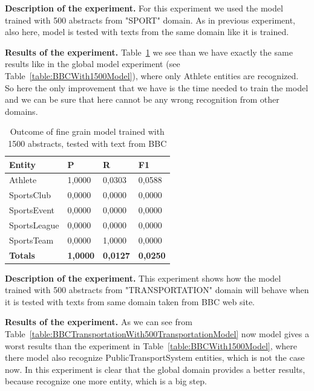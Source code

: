 \documentclass[thesis=M,english]{FITthesis}[2018/05/30]
\begin{document}
\textbf{Description of the experiment.} For this experiment we used the model trained with 500 abstracts from "SPORT" domain. As in previous experiment, also here, model is tested with texts from the same domain like it is trained.

\textbf{Results of the experiment.} Table~\ref{table:BBCSportWith500SportModel} we see than we have exactly the same results like in the global model experiment (see Table~\ref{table:BBCWith1500Model}), where only Athlete entities are recognized. So here the only improvement that we have is the time needed to train the model and we can be sure that here cannot be any wrong recognition from other domains.
	
	\begin{table}[H]\centering
	\begin{tabular}{|l|l|l|l|}
		\hline {\textbf{Entity}} & {\textbf{P}} & {\textbf{R}} & {\textbf{F1}}\\\hline
        Athlete & 1,0000 & 0,0303 & 0,0588\\
		SportsClub & 0,0000 & 0,0000 & 0,0000\\
    	SportsEvent & 0,0000 & 0,0000 & 0,0000\\
   		SportsLeague & 0,0000 & 0,0000 & 0,0000\\
   		SportsTeam & 0,0000 & 1,0000 & 0,0000\\\hline  
		\textbf{Totals} & \textbf{1,0000} & \textbf{0,0127} & \textbf{0,0250}\\\hline
	\end{tabular}			
		\caption{Outcome of fine grain model trained with 1500 abstracts, tested with text from BBC\label{table:BBCSportWith500SportModel}}
	\end{table}

\textbf{Description of the experiment.} This experiment shows how the model trained with 500 abstracts from "TRANSPORTATION" domain will behave when it is tested with texts from same domain taken from BBC web site.

\textbf{Results of the experiment.} As we can see from Table~\ref{table:BBCTransportationWith500TransportationModel} now model gives a worst results than the experiment in Table~\ref{table:BBCWith1500Model}, where there model also recognize PublicTransportSystem entities, which is not the case now. In this experiment is clear that the global domain provides a better results, because recognize one more entity, which is a big step. 
	
\end{document}
